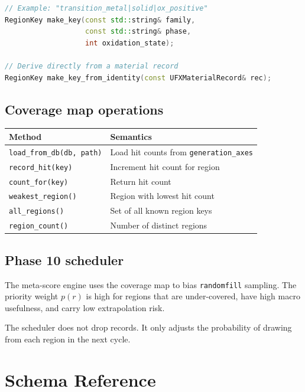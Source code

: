 \documentclass[11pt,letterpaper]{article}
\begin{document}
\begin{lstlisting}[language=C++]
// Example: "transition_metal|solid|ox_positive"
RegionKey make_key(const std::string& family,
				   const std::string& phase,
				   int oxidation_state);

// Derive directly from a material record
RegionKey make_key_from_identity(const UFXMaterialRecord& rec);
\end{lstlisting}

\subsection{Coverage map operations}

\begin{center}
\begin{tabular}{ll}
\toprule
Method & Semantics \\
\midrule
\texttt{load\_from\_db(db, path)} & Load hit counts from \texttt{generation\_axes} \\
\texttt{record\_hit(key)}         & Increment hit count for region \\
\texttt{count\_for(key)}          & Return hit count \\
\texttt{weakest\_region()}        & Region with lowest hit count \\
\texttt{all\_regions()}           & Set of all known region keys \\
\texttt{region\_count()}          & Number of distinct regions \\
\bottomrule
\end{tabular}
\end{center}

\subsection{Phase 10 scheduler}

The meta-score engine uses the coverage map to bias \texttt{randomfill}
sampling.  The priority weight $p(r)$ is high for regions that are
under-covered, have high macro usefulness, and carry low extrapolation risk.

The scheduler does not drop records.  It only adjusts the probability
of drawing from each region in the next cycle.

\section{Schema Reference}
\end{document}
